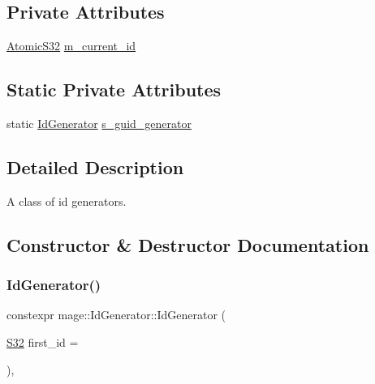 \subsection*{Private Attributes}
\begin{DoxyCompactItemize}
\item 
\hyperlink{namespacemage_a34972c09c02b691cd7cc5ea34db1e778}{Atomic\+S32} \hyperlink{classmage_1_1_id_generator_af834ccd6b694775f434949a1c1382965}{m\+\_\+current\+\_\+id}
\end{DoxyCompactItemize}
\subsection*{Static Private Attributes}
\begin{DoxyCompactItemize}
\item 
static \hyperlink{classmage_1_1_id_generator}{Id\+Generator} \hyperlink{classmage_1_1_id_generator_aae064239698f2a64515bc0e91ff9a303}{s\+\_\+guid\+\_\+generator}
\end{DoxyCompactItemize}


\subsection{Detailed Description}
A class of id generators. 

\subsection{Constructor \& Destructor Documentation}
\hypertarget{classmage_1_1_id_generator_a62eacd065b27320c207d72acf94df7a3}{}\label{classmage_1_1_id_generator_a62eacd065b27320c207d72acf94df7a3} 
\subsubsection{\texorpdfstring{Id\+Generator()}{IdGenerator()}\hspace{0.1cm}{\footnotesize\ttfamily [1/3]}}
{\footnotesize\ttfamily constexpr mage\+::\+Id\+Generator\+::\+Id\+Generator (\begin{DoxyParamCaption}\item[{\hyperlink{namespacemage_a642e05c5c83642b6946703615cdbf2da}{S32}}]{first\+\_\+id = {} }\end{DoxyParamCaption})\hspace{0.3cm}{\ttfamily [explicit]}, {\ttfamily [noexcept]}}

